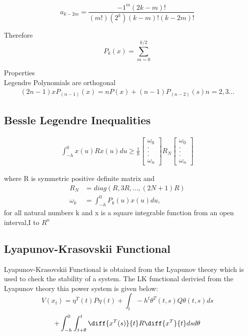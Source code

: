 \documentclass[journal]{IEEEtran}
\begin{document}
    \begin{equation}
    a_{k-2m} = \frac{-1^m(2k-m)!}{(m!)(2^k)(k-m)!(k-2m)!}
  \end{equation}


  
    Therefore
    \begin{equation}
    P_k(x) = \sum_{m=0}^{k/2} 
  \end{equation}

   Properties \\
    Legendre Polynomials are orthogonal
    \begin{align}
    (2n-1)xP_(n-1)(x) = nP(x) + (n-1)P_(n-2)(s) n = 2, 3 ...
  \end{align}

\subsection{Bessle Legendre Inequalities}
 \begin{align}
   \int_{-h}^{0}x(u)Rx(u)du \geq \frac{1}{h}
   \begin{bmatrix}
     \omega_0 \\
     . \\
     . \\
     . \\
     \omega_n
   \end{bmatrix}
   R_N
   \begin{bmatrix}
  \omega_0 \\
  . \\
  . \\
  . \\
  \omega_n
\end{bmatrix}
 \end{align}

 where R is symmetric positive definite matrix
 and 
 \begin{align}
   R_N &= diag(R,3R,...,(2N+1)R) \\
   \omega_k&= \int_{-h}^{0}P_k(u)x(u)du, 
 \end{align}
 for all natural numbers k and x is a square integrable function
 from an open interval,I to $R^n$
\subsection{Lyapunov-Krasovskii Functional}
Lyapunov-Krasovskii Functional is obtained from the Lyapunov theory which is used to check the stability of a system. The LK functional derivied from the Lyapunov theory thia power system is given below:
\begin{equation*}
V(x_t) = \eta ^T (t)P \eta(t) + \int _t-h^t \theta ^T(t,s)Q\theta(t,s)ds 
\end{equation*}
\begin{equation*}
 +\int _{-h} ^0 \int _{t+\theta}^t\diff{x^T(s)}{t}R\diff{x^T}{t}dsd\theta
\end{equation*}
\end{document}
